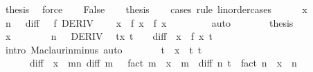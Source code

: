 \begin{isabellebody}
\ {\isacharquery}{\kern0pt}thesis\ \isamarkupfalse%
\ force\isanewline
{}\isamarkupfalse%
\isanewline
\ \ \isamarkupfalse%
\ False\isanewline
\ \ \isamarkupfalse%
\ {\isacharquery}{\kern0pt}thesis\isanewline
\ \ \isamarkupfalse%
\ {\isacharparenleft}{\kern0pt}cases\ rule{\isacharcolon}{\kern0pt}\ linorder{\isacharunderscore}{\kern0pt}cases{\isacharparenright}{\kern0pt}\isanewline
\ \ \ \ \isamarkupfalse%
\ {\isachardoublequoteopen}x\ {\isacharequal}{\kern0pt}\ {}{\isachardoublequoteclose}\isanewline
\ \ \ \ \isamarkupfalse%
\ {\isacartoucheopen}n\ {\isasymnoteq}\ {}{\isacartoucheclose}\ {\isacartoucheopen}diff\ {}\ {\isacharequal}{\kern0pt}\ f{\isacartoucheclose}\ DERIV\ \isamarkupfalse%
\ {\isachardoublequoteopen}{\isasymbar}{}{\isasymbar}\ {\isasymle}\ {\isasymbar}x{\isasymbar}\ {\isasymand}\ f\ x\ {\isacharequal}{\kern0pt}\ {\isacharquery}{\kern0pt}f\ x\ {}{\isachardoublequoteclose}\isanewline
\ \ \ \ \ \ \isamarkupfalse%
\ auto\isanewline
\ \ \ \ \isamarkupfalse%
\ \isamarkupfalse%
\ {\isacharquery}{\kern0pt}thesis\ \isacommand{{\isachardot}{\kern0pt}{\isachardot}{\kern0pt}}\isamarkupfalse%
\isanewline
\ \ \isamarkupfalse%
\isanewline
\ \ \ \ \isamarkupfalse%
\ {\isachardoublequoteopen}x\ {\isacharless}{\kern0pt}\ {}{\isachardoublequoteclose}\isanewline
\ \ \ \ \isamarkupfalse%
\ {\isacartoucheopen}n\ {\isasymnoteq}\ {}{\isacartoucheclose}\ DERIV\ \isamarkupfalse%
\ {\isachardoublequoteopen}{\isasymexists}t{\isachargreater}{\kern0pt}x{\isachardot}{\kern0pt}\ t\ {\isacharless}{\kern0pt}\ {}\ {\isasymand}\ diff\ {}\ x\ {\isacharequal}{\kern0pt}\ {\isacharquery}{\kern0pt}f\ x\ t{\isachardoublequoteclose}\isanewline
\ \ \ \ \ \ \isamarkupfalse%
\ {\isacharparenleft}{\kern0pt}intro\ Maclaurin{\isacharunderscore}{\kern0pt}minus{\isacharparenright}{\kern0pt}\ auto\isanewline
\ \ \ \ \isamarkupfalse%
\ \isamarkupfalse%
\ t\ \ {\isachardoublequoteopen}x\ {\isacharless}{\kern0pt}\ t{\isachardoublequoteclose}\ {\isachardoublequoteopen}t\ {\isacharless}{\kern0pt}\ {}{\isachardoublequoteclose}\isanewline
\ \ \ \ \ \ {\isachardoublequoteopen}diff\ {}\ x\ {\isacharequal}{\kern0pt}\ {\isacharparenleft}{\kern0pt}{\isasymSum}m{\isacharless}{\kern0pt}n{\isachardot}{\kern0pt}\ diff\ m\ {}\ {\isacharslash}{\kern0pt}\ fact\ m\ {\isacharasterisk}{\kern0pt}\ x\ {\isacharcircum}{\kern0pt}\ m{\isacharparenright}{\kern0pt}\ {\isacharplus}{\kern0pt}\ diff\ n\ t\ {\isacharslash}{\kern0pt}\ fact\ n\ {\isacharasterisk}{\kern0pt}\ x\ {\isacharcircum}{\kern0pt}\ n{\isachardoublequoteclose}\isanewline

\end{isabellebody}

